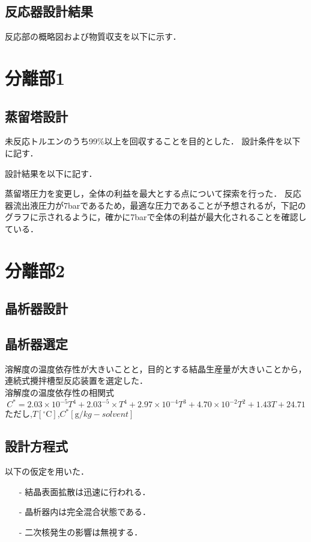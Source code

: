 \documentclass[a4j]{jsreport}
\begin{document}
\section{反応器設計結果}
反応部の概略図および物質収支を以下に示す．

\newpage
\chapter{分離部1}
\section{蒸留塔設計}
未反応トルエンのうち99\%以上を回収することを目的とした．
設計条件を以下に記す．

設計結果を以下に記す．

蒸留塔圧力を変更し，全体の利益を最大とする点について探索を行った．
反応器流出液圧力が7barであるため，最適な圧力であることが予想されるが，下記の
グラフに示されるように，確かに7barで全体の利益が最大化されることを確認している．

\newpage
\chapter{分離部2}
\section{晶析器設計}
\section{晶析器選定}
溶解度の温度依存性が大きいことと，目的とする結晶生産量が大きいことから，
連続式攪拌槽型反応装置を選定した．\\
溶解度の温度依存性の相関式
\begin{equation}
    C^*=2.03\times 10^{-5}T^4 +2.03^{-5}\times T^4 + 2.97\times 10^{-4}T^3 + 4.70\times 10^{-2}T^2
        + 1.43T + 24.71
\end{equation}
ただし,$T[\mathrm{^\circ C}]$,$C^*[{\mathrm g/kg-solvent}]$\\

\section{設計方程式}
以下の仮定を用いた．
\begin{itemize}
    \setlength{\parskip}{0pt}
    \setlength{\itemsep}{2pt}
    \item[-] 結晶表面拡散は迅速に行われる．
    \item[-] 晶析器内は完全混合状態である．
    \item[-] 二次核発生の影響は無視する．
\end{itemize}
\end{document}
